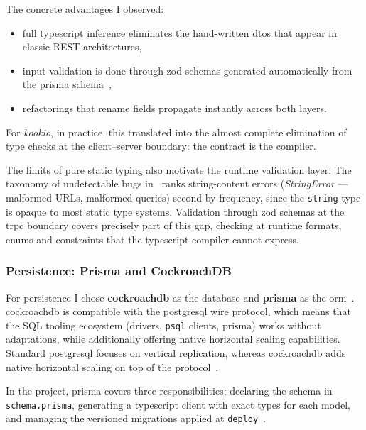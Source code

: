 The concrete advantages I observed:
\begin{itemize}
  \item full \gls{typescript} inference eliminates the hand-written \glspl{dto} that appear in classic REST architectures,
  \item input validation is done through \gls{zod} schemas generated automatically from the \gls{prisma} schema~\cite{zod,prisma_zod_generator},
  \item refactorings that rename fields propagate instantly across both layers.
\end{itemize}

For \textit{\gls{kookio}}, in practice, this translated into the almost complete elimination of type checks at the client--server boundary: the contract is the compiler.

The limits of pure static typing also motivate the runtime validation layer. The taxonomy of undetectable bugs in~\cite{gao2017type} ranks string-content errors (\textit{StringError} --- malformed URLs, malformed queries) second by frequency, since the \texttt{string} type is opaque to most static type systems. Validation through \gls{zod} schemas at the \gls{trpc} boundary covers precisely part of this gap, checking at runtime formats, enums and constraints that the \gls{typescript} compiler cannot express.

\subsubsection{Persistence: Prisma and CockroachDB}\label{subsec:persistenta}

For persistence I chose \textbf{\gls{cockroachdb}} as the database and \textbf{\gls{prisma}} as the \gls{orm}~\cite{prisma_orm,cockroachdb}.
\gls{cockroachdb} is compatible with the \gls{postgresql} wire protocol, which means that the SQL tooling ecosystem (drivers, \texttt{psql} clients, \gls{prisma}) works without adaptations, while additionally offering native horizontal scaling capabilities.
Standard \gls{postgresql} focuses on vertical replication, whereas \gls{cockroachdb} adds native horizontal scaling on top of the protocol~\cite{cockroachdb}.

In the project, \gls{prisma} covers three responsibilities: declaring the schema in \texttt{schema.prisma}, generating a \gls{typescript} client with exact types for each model, and managing the versioned migrations applied at \texttt{deploy}~\cite{prisma_orm}.

